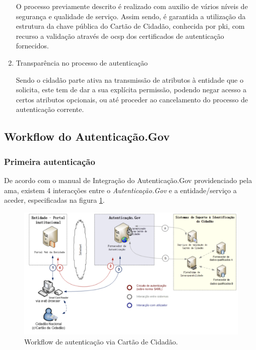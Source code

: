 \begin{enumerate}
    O processo previamente descrito é realizado com auxilio de vários níveis de segurança e qualidade de serviço. Assim sendo, é garantida a utilização da estrutura da chave pública do Cartão de Cidadão, conhecida por \gls{pki}, com recurso a validação através de \gls{ocsp} dos certificados de autenticação fornecidos.
    
    \item Transparência no processo de autenticação
    
    Sendo o cidadão parte ativa na transmissão de atributos à entidade que o solicita, este tem de dar a sua explícita permissão, podendo negar acesso a certos atributos opcionais, ou até proceder ao cancelamento do processo de autenticação corrente.
\end{enumerate}

\cleardoublepage
\subsection{Workflow do Autenticação.Gov}
\subsubsection{Primeira autenticação}
De acordo com o manual de Integração do Autenticação.Gov\cite{manualAuthGov} providenciado pela \gls{ama}, existem 4 interacções entre o \emph{Autenticação.Gov} e a entidade/serviço a aceder, especificadas na figura \ref{workflow}.

\begin{figure}[h]
    \centering
    \includegraphics[width=\textwidth]{img/authgov/workflow.png}
    \caption{Workflow de autenticação via Cartão de Cidadão.}
    \label{workflow}
\end{figure}

